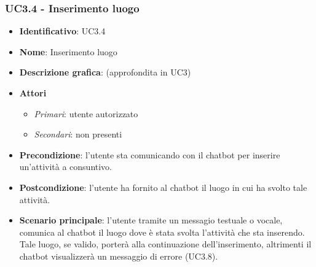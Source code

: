 \subsubsection{UC3.4 - Inserimento luogo }
\begin{itemize}
    \item \textbf{Identificativo}: UC3.4
    \item \textbf{Nome}: Inserimento luogo   
    \item \textbf{Descrizione grafica}: (approfondita in UC3)
    \item \textbf{Attori}
        \begin{itemize} 
            \item \textit{Primari}: utente autorizzato
            \item \textit{Secondari}: non presenti
        \end{itemize}
    \item \textbf{Precondizione}: l'utente sta comunicando con il chatbot per inserire un'attività a consuntivo. 
    \item \textbf{Postcondizione}: l'utente ha fornito al chatbot il luogo in cui ha svolto tale attività. 
    \item \textbf{Scenario principale}: l'utente tramite un messagio testuale o vocale, comunica al chatbot il luogo dove è stata svolta l'attività che sta inserendo. Tale luogo, se valido, porterà alla continuazione dell'inserimento, altrimenti il chatbot visualizzerà un messaggio di errore (UC3.8). 
\end{itemize}

